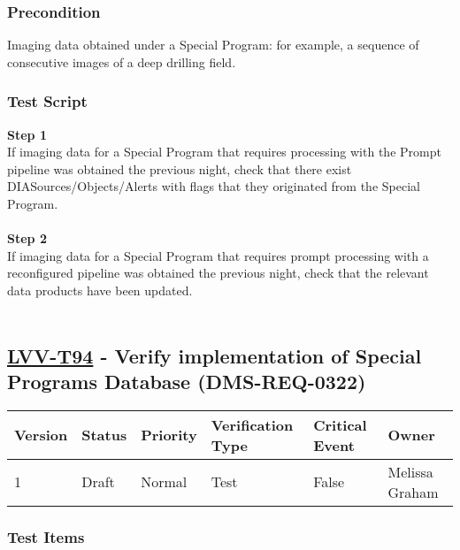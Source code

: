 \hypertarget{precondition-12}{%
\subsubsection{Precondition}\label{precondition-12}}

Imaging data obtained under a Special Program: for example, a sequence
of consecutive images of a deep drilling field.

\hypertarget{test-script-70}{%
\subsubsection{Test Script}\label{test-script-70}}

\textbf{Step 1}\\
If imaging data for a Special Program that requires processing with the
Prompt pipeline was obtained the previous night, check that there exist
DIASources/Objects/Alerts with flags that they originated from the
Special Program.\\
~\\
\textbf{Step 2}\\
If imaging data for a Special Program that requires prompt processing
with a reconfigured pipeline was obtained the previous night, check that
the relevant data products have been updated.\\
~\\

\hypertarget{lvv-t94---verify-implementation-of-special-programs-database-dms-req-0322}{%
\subsection{\texorpdfstring{\href{https://jira.lsstcorp.org/secure/Tests.jspa\#/testCase/LVV-T94}{LVV-T94}
- Verify implementation of Special Programs Database
(DMS-REQ-0322)}{LVV-T94 - Verify implementation of Special Programs Database (DMS-REQ-0322)}}\label{lvv-t94---verify-implementation-of-special-programs-database-dms-req-0322}}

\begin{longtable}[]{@{}llllll@{}}
\toprule
Version & Status & Priority & Verification Type & Critical Event &
Owner\tabularnewline
\midrule
\endhead
1 & Draft & Normal & Test & False & Melissa Graham\tabularnewline
\bottomrule
\end{longtable}

\hypertarget{test-items-70}{%
\subsubsection{Test Items}\label{test-items-70}}

